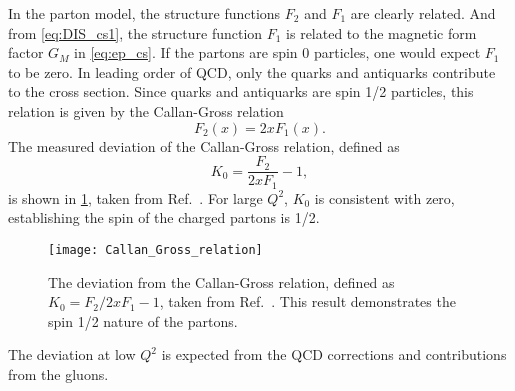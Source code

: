 \documentclass[../main.tex]{subfiles}
\begin{document}
In the parton model, the structure functions $F_2$ and $F_1$ are clearly related. And
from \cref{eq:DIS_cs1}, the structure function $F_1$ is
related to the magnetic form factor $G_M$ in \cref{eq:ep_cs}. If the partons
are spin 0 particles, one would expect $F_1$ to be zero. In leading order of QCD,
only the quarks and antiquarks contribute to the cross section. Since quarks and
antiquarks are spin 1/2 particles, this relation is given by the Callan-Gross
relation \cite{callan1968,callan1969}
\begin{equation}
	F_2\left(x\right) = 2x F_1\left(x\right).
	\label{eq:CS_relation}
\end{equation}
The measured deviation of the Callan-Gross relation, defined as
\begin{equation}
	K_0 = \frac{F_2}{2xF_1}-1,
\end{equation}
is shown in \cref{fig:callan_gross}, taken from Ref.~\cite{kendall1991}.
For large $Q^2$, $K_0$ is consistent with zero, establishing the spin of the
charged partons is 1/2.
\begin{figure}[htbp!]
	\centering
	\texttt{[image: Callan\_Gross\_relation]}
	\caption{The deviation from the Callan-Gross relation, defined as
		$K_0=F_2/2xF_1 -1$, taken from Ref.~\cite{kendall1991}. This result
		demonstrates the spin 1/2 nature of the partons.}
	\label{fig:callan_gross}
\end{figure}
The deviation at low $Q^2$ is expected from the QCD corrections and contributions from
the gluons.
\end{document}
